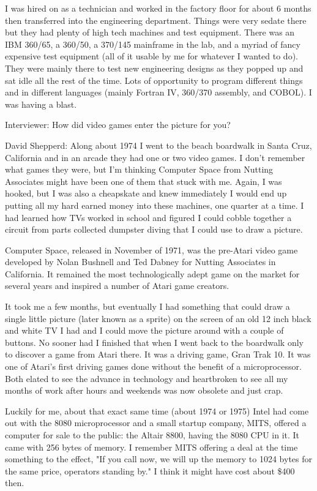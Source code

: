 I was hired on as a technician and worked in the factory floor for about 6 months then transferred into the engineering department. Things were very sedate there but they had plenty of high tech machines and test equipment. There was an IBM 360/65, a 360/50, a 370/145 mainframe in the lab, and a myriad of fancy expensive test equipment (all of it usable by me for whatever I wanted to do). They were mainly there to test new engineering designs as they popped up and sat idle all the rest of the time. Lots of opportunity to program different things and in different languages (mainly Fortran IV, 360/370 assembly, and COBOL). I was having a blast.

\textcolor{interviewer}{Interviewer:} How did video games enter the picture for you?

\textcolor{interviewee}{David Shepperd:} Along about 1974 I went to the beach boardwalk in Santa Cruz, California and in an arcade they had one or two video games. I don't remember what games they were, but I'm thinking Computer Space from Nutting Associates might have been one of them that stuck with me. Again, I was hooked, but I was also a cheapskate and knew immediately I would end up putting all my hard earned money into these machines, one quarter at a time. I had learned how TVs worked in school and figured I could cobble together a circuit from parts collected dumpster diving that I could use to draw a picture. 

\begin{tcolorbox}[]
    Computer Space, released in November of 1971, was the pre-Atari video game developed by Nolan Bushnell and Ted Dabney for Nutting Associates in California. It remained the most technologically adept game on the market for several years and inspired a number of Atari game creators.
\end{tcolorbox} 

It took me a few months, but eventually I had something that could draw a single little picture (later known as a sprite) on the screen of an old 12 inch black and white TV I had and I could move the picture around with a couple of buttons. No sooner had I finished that when I went back to the boardwalk only to discover a game from Atari there. It was a driving game, Gran Trak 10. It was one of Atari's first driving games done without the benefit of a microprocessor. Both elated to see the advance in technology and heartbroken to see all my months of work after hours and weekends was now obsolete and just crap.

Luckily for me, about that exact same time (about 1974 or 1975) Intel had come out with the 8080 microprocessor and a small startup company, MITS, offered a computer for sale to the public: the Altair 8800, having the 8080 CPU in it. It came with 256 bytes of memory. I remember MITS offering a deal at the time something to the effect, "If you call now, we will up the memory to 1024 bytes for the same price, operators standing by." I think it might have cost about \$400 then. 

